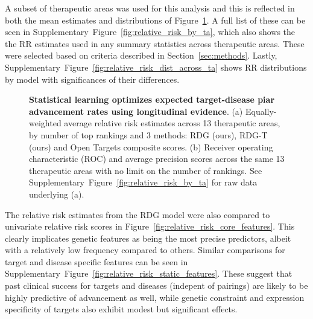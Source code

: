 \documentclass{article}
\begin{document}
A subset of therapeutic areas was used for this analysis and this is reflected in both the mean estimates and distributions of Figure~\ref{fig:performance_across_ta}. A full list of these can be seen in Supplementary~Figure~\ref{fig:relative_risk_by_ta}, which also shows the the RR estimates used in any summary statistics across therapeutic areas. These were selected based on criteria described in Section~\ref{sec:methods}. Lastly, Supplementary~Figure~\ref{fig:relative_risk_dist_across_ta} shows RR distributions by model with significances of their differences.

\begin{figure}[!htb]
  \centering
  \captionsetup{width=.9\linewidth}
  \qquad
  \caption{
    \textbf{Statistical learning optimizes expected target-disease piar advancement rates using longitudinal evidence}.
    (a) Equally-weighted average relative risk estimates across 13 therapeutic areas, by number of top rankings and 3 methods: RDG (ours), RDG-T (ours) and Open Targets composite scores. 
    (b) Receiver operating characteristic (ROC) and average precision scores across the same 13 therapeutic areas with no limit on the number of rankings. 
    See Supplementary~Figure~\ref{fig:relative_risk_by_ta} for raw data underlying (a).
  }
  \label{fig:performance_across_ta}
\end{figure}

The relative risk estimates from the RDG model were also compared to univariate relative risk scores in Figure~\ref{fig:relative_risk_core_features}. This clearly implicates genetic features as being the most precise predictors, albeit with a relatively low frequency compared to others. Similar comparisons for target and disease specific features can be seen in Supplementary~Figure~\ref{fig:relative_risk_static_features}. These suggest that past clinical success for targets and diseases (indepent of pairings) are likely to be highly predictive of advancement as well, while genetic constraint and expression specificity of targets also exhibit modest but significant effects.
\end{document}
